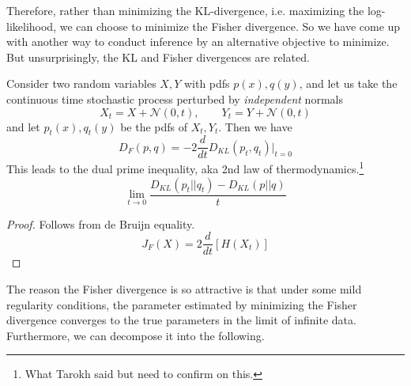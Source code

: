 \documentclass{article}
\begin{document}
    Therefore, rather than minimizing the KL-divergence, i.e. maximizing the log-likelihood, we can choose to minimize the Fisher divergence. So we have come up with another way to conduct inference by an alternative objective to minimize. But unsurprisingly, the KL and Fisher divergences are related.  

    \begin{theorem}
      Consider two random variables $X, Y$ with pdfs $p(x), q(y)$, and let us take the continuous time stochastic process perturbed by \textit{independent} normals 
      \begin{equation}
        X_t = X + \mathcal{N}(0, t), \qquad Y_t = Y + \mathcal{N}(0, t)
      \end{equation}
      and let $p_t (x), q_t (y)$ be the pdfs of $X_t, Y_t$. Then we have 
      \begin{equation}
        D_F (p, q) = -2 \frac{d}{dt} D_{KL} (p_t, q_t) \bigg|_{t = 0}
      \end{equation}
      This leads to the dual prime inequality, aka 2nd law of thermodynamics.\footnote{What Tarokh said but need to confirm on this.}
      \begin{equation}
        \lim_{t \rightarrow 0} \frac{D_{KL}(p_t || q_t) - D_{KL}(p||q)}{t}
      \end{equation}
    \end{theorem}
    \begin{proof}
      Follows from de Bruijn equality. 
      \begin{equation}
        J_F (X) = 2 \frac{d}{dt} [H(X_t)]
      \end{equation}
    \end{proof}

    The reason the Fisher divergence is so attractive is that under some mild regularity conditions, the parameter estimated by minimizing the Fisher divergence converges to the true parameters in the limit of infinite data. Furthermore, we can decompose it into the following. 
\end{document}
